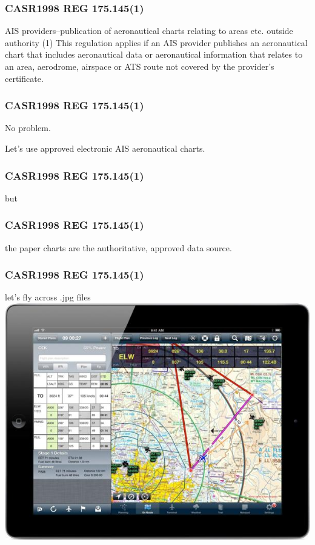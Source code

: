 \begin{frame}
\frametitle{CASR1998 REG 175.145(1)}
\begin{block}{AIS providers--publication of aeronautical charts relating to areas etc. outside authority}
(1) This regulation applies if an AIS provider publishes an aeronautical chart that includes aeronautical data or aeronautical information that relates to an area, aerodrome, airspace or ATS route not covered by the provider's certificate.
\end{block}
\end{frame}
\begin{frame}
\frametitle{CASR1998 REG 175.145(1)}
\large
\begin{center}
No problem.
\par
Let's use approved electronic AIS aeronautical charts.
\end{center}
\end{frame}

\begin{frame}
\frametitle{CASR1998 REG 175.145(1)}
\large
\begin{center}
but
\end{center}
\end{frame}

\begin{frame}
\frametitle{CASR1998 REG 175.145(1)}
\large
\begin{center}
the paper charts are the authoritative, approved data source.
\end{center}
\end{frame}

\begin{frame}
\frametitle{CASR1998 REG 175.145(1)}
\begin{block}{let's fly across .jpg files}
\includegraphics[height=0.5\textheight]{image/avplan-screenshot.jpg}
\end{block}
\end{frame}

